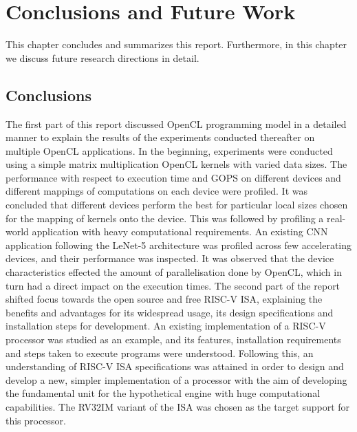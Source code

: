 \chapter{Conclusions and Future Work}
\label{ch7_conclusion}
This chapter concludes and summarizes this report.
Furthermore, in this chapter we discuss future research directions in detail.

\section{Conclusions}
\label{sect7_1}
The first part of this report discussed OpenCL programming model in a detailed manner to explain the results of the experiments conducted thereafter on multiple OpenCL applications. In the beginning, experiments were conducted using a simple matrix multiplication OpenCL kernels with varied data sizes. The performance with respect to execution time and \ac{GOPS} on different devices and different mappings of computations on each device were profiled. It was concluded that different devices perform the best for particular local sizes chosen for the mapping of kernels onto the device.\newline\newline
This was followed by profiling a real-world application with heavy computational requirements. An existing CNN application following the LeNet-5 architecture was profiled across few accelerating devices, and their performance was inspected. It was observed that the device characteristics effected the amount of parallelisation done by OpenCL, which in turn had a direct impact on the execution times.\newline\newline
The second part of the report shifted focus towards the open source and free RISC-V ISA, explaining the benefits and advantages for its widespread usage, its design specifications and installation steps for development. An existing implementation of a RISC-V processor was studied as an example, and its features, installation requirements and steps taken to execute programs were understood.\newline\newline
Following this, an understanding of RISC-V ISA specifications was attained in order to design and develop a new, simpler implementation of a processor with the aim of developing the fundamental unit for the hypothetical engine with huge computational capabilities. The RV32IM variant of the ISA was chosen as the target support for this processor.


